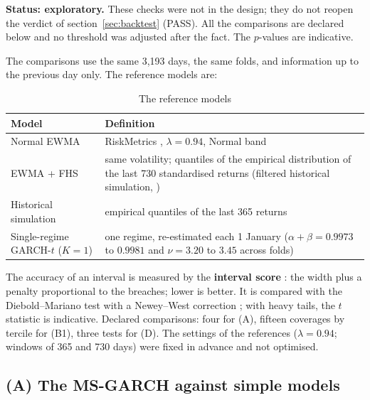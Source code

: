 \documentclass[12pt,a4paper]{article}
\begin{document}
\begin{limitbox}
	\textbf{Status: exploratory.} These checks were not in the design; they do not reopen the verdict of section~\ref{sec:backtest} (PASS). All the comparisons are declared below and no threshold was adjusted after the fact. The $p$-values are indicative.
\end{limitbox}

The comparisons use the same 3,193 days, the same folds, and information up to the previous day only. The reference models are:

\begin{table}[H]
	\centering
	\small
	\caption{The reference models}
	\label{tab:bm-defs}
	\begin{tabular}{lp{8.4cm}}
		\toprule
		Model & Definition \\
		\midrule
		Normal EWMA & RiskMetrics \citep{riskmetrics1996}, $\lambda=0.94$, Normal band \\
		EWMA + FHS & same volatility; quantiles of the empirical distribution of the last 730 standardised returns (filtered historical simulation, \citealt{baronesadesi1999}) \\
		Historical simulation & empirical quantiles of the last 365 returns \\
		Single-regime GARCH-$t$ ($K=1$) & one regime, re-estimated each 1 January ($\alpha+\beta=0.9973$ to $0.9981$ and $\nu=3.20$ to $3.45$ across folds) \\
		\bottomrule
	\end{tabular}
\end{table}

The accuracy of an interval is measured by the \textbf{interval score} \citep{gneitingraftery2007}: the width plus a penalty proportional to the breaches; lower is better. It is compared with the Diebold--Mariano test \citep{dieboldmariano1995} with a Newey--West correction \citep{neweywest1987}; with heavy tails, the $t$ statistic is indicative. Declared comparisons: four for (A), fifteen coverages by tercile for (B1), three tests for (D). The settings of the references ($\lambda=0.94$; windows of 365 and 730 days) were fixed in advance and not optimised.

\subsection{(A) The MS-GARCH against simple models}
\end{document}
